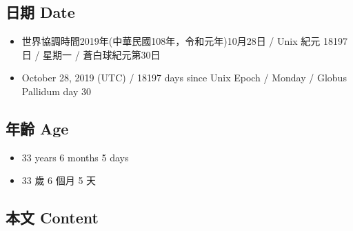 \documentclass[a5paper, 12pt
]{book}
\providecommand{\tightlist}{%
  \setlength{\itemsep}{0pt}\setlength{\parskip}{0pt}}
\begin{document}
\hypertarget{ux65e5ux671f-date-29}{%
\subsection{日期 Date}\label{ux65e5ux671f-date-29}}

\begin{itemize}
\tightlist
\item
  世界協調時間2019年(中華民國108年，令和元年)10月28日 / Unix 紀元 18197
  日 / 星期一 / 蒼白球紀元第30日
\item
  October 28, 2019 (UTC) / 18197 days since Unix Epoch / Monday / Globus
  Pallidum day 30
\end{itemize}

\hypertarget{ux5e74ux9f61-age-29}{%
\subsection{年齡 Age}\label{ux5e74ux9f61-age-29}}

\begin{itemize}
\tightlist
\item
  33 years 6 months 5 days
\item
  33 歲 6 個月 5 天
\end{itemize}

\hypertarget{ux672cux6587-content-29}{%
\subsection{本文 Content}\label{ux672cux6587-content-29}}
\end{document}
